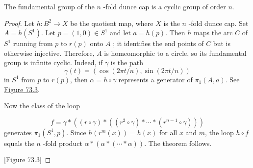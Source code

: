 \begin{theorem}
\label{thm:\thetheorem}
The fundamental group of the \(n\) -fold dunce cap is a cyclic group of order \(n\).
\end{theorem}

\begin{proof}
Let \(h : B^{2} \rightarrow X\) be the quotient map, where \(X\) is the \(n\) -fold dunce cap. Set \(A = h( S^{1})\). Let \(p = ( {1,0}) \in {S}^{1}\) and let \(a = h( p)\). Then \(h\) maps the arc \(C\) of \(S^{1}\) running from \(p\) to \(r( p)\) onto \(A\) ; it identifies the end points of \(C\) but is otherwise injective. Therefore, \(A\) is homeomorphic to a circle, so its fundamental group is infinite cyclic. Indeed, if \(\gamma\) is the path
\[
\gamma ( t) = ( {\cos ( {{2\pi t}/n}),\sin ( {{2\pi t}/n}) })
\]
in \(S^{1}\) from \(p\) to \(r( p)\), then \(\alpha = h \circ \gamma\) represents a generator of \({\pi }_{1}( {A,a})\). See \hyperref[fig:73.3]{Figure 73.3}.

Now the class of the loop

\[
f = \gamma * ( {( {r \circ \gamma }) * ( {( {r^{2} \circ \gamma }) * \cdots * ( {r^{n - 1} \circ \gamma }) }) })
\]
generates \({\pi }_{1}( {S^{1},p})\). Since \(h( {r^{m}(x) }) = h(x)\) for all \(x\) and \(m\), the loop \(h \circ f\) equals the \(n\) -fold product \(\alpha * ( {\alpha * ( {\cdots * \alpha }) })\). The theorem follows.

[Figure 73.3]
\end{proof}

